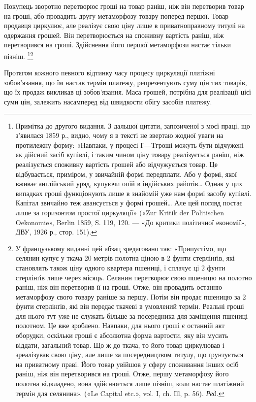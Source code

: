 Покупець зворотно перетворює гроші на товар раніш, ніж
він перетворив товар на гроші, або провадить другу метаморфозу
товару поперед першої. Товар продавця циркулює, але реалізує
свою ціну лише в приватноправному титулі на одержання
грошей. Він перетворюється на споживну вартість раніш, ніж
перетворився на гроші. Здійснення його першої метаморфози
настає тільки пізніш. \footnote*{Примітка до другого видання. З дальшої цитати, запозиченої з
моєї праці, що з’явилася 1859 р., видно, чому я в тексті не звертаю жодної
уваги на протилежну форму: «Навпаки, у процесі $Г — Т г$роші можуть
бути відчужені як дійсний засіб купівлі, і таким чином ціну товару реалізується
раніш, ніж реалізується споживну вартість грошей або відчужується
товар. Це відбувається, приміром, у звичайній формі передплати.
Або у формі, якої вживає англійський уряд, купуючи опій в індійських
райотів\dots{} Однак у цих випадках гроші функціонують лише в знайомій
уже нам формі засобу купівлі. Капітал звичайно теж авансується у формі
грошей\dots{} Але цей погляд постає лише за горизонтом простої циркуляції»
(«Zur Kritik der Politischen Oekonomie», Berlin 1859, S. 119, 120. — «До
критики політичної економії», ДВУ, 1926 р., стор. 151).}\footnote{У французькому виданні цей абзац зредаговано так: «Припустімо,
що селянин купує у ткача 20 метрів полотна ціною в 2 фунти стерлінґів,
які становлять також ціну одного квартера пшениці, і сплачує ці 2 фунти
стерлінґів лише через місяць. Селянин перетворює свою пшеницю на
полотно раніш, ніж він перетворив її на гроші. Отже, він провадить останню
метаморфозу свого товару раніше за першу. Потім він продає
пшеницю за 2 фунти стерлінґів, які він передає ткачеві в умовлений термін.
Реальні гроші для нього тут уже не служать більше за посередника
для заміщення пшениці полотном. Це вже зроблено. Навпаки, для нього
гроші є останній акт оборудки, оскільки гроші є абсолютна форма вартости,
яку він мусить віддати, загальний товар. Що ж до ткача, то його
товар циркулював і зреалізував свою ціну, але лише за посередництвом
титулу, що ґрунтується на приватному праві. Його товар увійшов у сферу
споживання інших осіб раніш, ніж він перетворився на гроші. Отже,
першу метаморфозу його полотна відкладено, вона здійснюється лише
пізніш, коли настає платіжний термін для селянина». («Le Capital etc.», vol.
I, ch. Ill, p. 56). \emph{Ред.}}

Протягом кожного певного відтинку часу процесу циркуляції
платіжні зобов’язання, що їм настав термін платежу, репрезентують
суму цін тих товарів, що їх продаж викликав ці зобов’язання.
Маса грошей, потрібна для реалізації цієї суми цін,
залежить насамперед від швидкости обігу засобів платежу.
\parbreak{}  %
